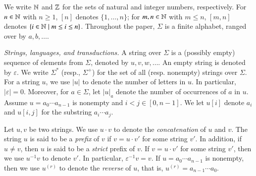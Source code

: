 
We write $\mathbb{N}$ and $\mathbb{Z}$ for the sets of natural and integer numbers, respectively. For $n \in \mathbb{N}$ with $n \ge 1$, $[n]$ denotes $\{1, \ldots, n\}$; for $m,n \in \mathbb{N}$ with $m \le n$,  $[m, n]$ denotes $\{ i \in \mathbb{N} \mid m \le i \le n \}$. Throughout the paper, $\Sigma$ is a finite alphabet, ranged over by $a,b,\ldots$.  

\smallskip
\noindent \emph{Strings, languages, and transductions.}
A string over $\Sigma$ is a (possibly empty) sequence of elements from $\Sigma$,
denoted by $u, v, w, \ldots$. An empty string is denoted by $\varepsilon$.  We write $\Sigma^*$ (resp., $\Sigma^+$) for the set of all (resp. nonempty) strings over $\Sigma$.
For a string $u$, we use $|u|$ to denote the number of letters in $u$. In particular, $|\varepsilon|=0$. Moreover, for $a \in \Sigma$, let $|u|_a$ denote the number of occurrences of $a$ in $u$. 
Assume $u=a_0\cdots a_{n-1}$ is nonempty and $i<j \in [0,n-1]$. %
We let $u[i]$ denote $a_i$ and $u[i,j]$ for the substring %
$a_i\cdots a_j$. 

Let $u, v$ be two strings. We use $u \cdot v$ to denote the \emph{concatenation} of $u$ and $v$.
The string $u$ is said to be a \emph{prefix} of $v$ if $v = u \cdot v'$ for some string $v'$.
In addition, if $u \neq v$, then $u$ is said to be a \emph{strict} prefix of $v$. 
%
If %
$v = u \cdot v'$ for some string $v'$, then 
we use $u^{-1} v$ to denote $v'$. In particular, $\varepsilon^{-1} v = v$.
If $u=a_0 \cdots a_{n-1}$ is nonempty, then we use $u^{(r)}$ to denote the \emph{reverse} of $u$, that is, $u^{(r)}= a_{n-1 }\cdots a_0$. %


